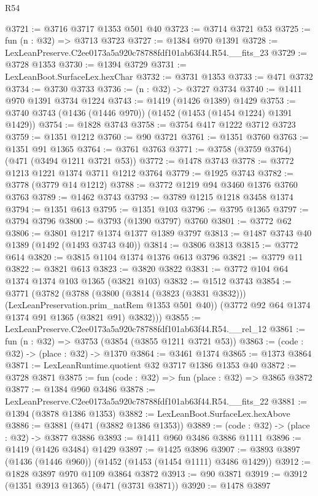 \begin{lexlean}{R54}
\begin{coremodule}
@3721 := @3716 @3717 @1353 @501 @40
@3723 := @3714 @3721 @53
@3725 := fun (n : @32) => @3713 @3723
@3727 := @1384 @970 @1391
@3728 := LexLeanPreserve.C2ee0173a5a920c78788fdf101ab63f44.R54.__fits_23
@3729 := @3728 @1353
@3730 := @1394 @3729
@3731 := LexLeanBoot.SurfaceLex.hexChar
@3732 := @3731 @1353
@3733 := @471 @3732
@3734 := @3730 @3733
@3736 := (n : @32) -> @3727 @3734
@3740 := @1411 @970 @1391 @3734 @1224
@3743 := @1419 (@1426 @1389) @1429
@3753 := @3740 @3743 (@1436 (@1446 @970)) (@1452 (@1453 (@1454 @1224) @1391 @1429))
@3754 := @1828 @3743
@3758 := @3754 @417 @1222 @3712 @3723
@3759 := @1351 @1212
@3760 := @90 @3721
@3761 := @1351 @3760
@3763 := @1351 @91 @1365
@3764 := @3761 @3763
@3771 := @3758 (@3759 @3764) (@471 (@3494 @1211 @3721 @53))
@3772 := @1478 @3743
@3778 := @3772 @1213 @1221 @1374 @3711 @1212 @3764
@3779 := @1925 @3743
@3782 := @3778 (@3779 @14 @1212)
@3788 := @3772 @1219 @94 @3460 @1376 @3760 @3763
@3789 := @1462 @3743
@3793 := @3789 @1215 @1218 @3458 @1374
@3794 := @1351 @613
@3795 := @1351 @103
@3796 := @3795 @1365
@3797 := @3794 @3796
@3800 := @3793 (@1390 @3797) @3760
@3801 := @3772 @62
@3806 := @3801 @1217 @1374 @1377 @1389 @3797
@3813 := @1487 @3743 @40 @1389 (@1492 (@1493 @3743 @40))
@3814 := @3806 @3813
@3815 := @3772 @614
@3820 := @3815 @1104 @1374 @1376 @613 @3796
@3821 := @3779 @11
@3822 := @3821 @613
@3823 := @3820 @3822
@3831 := @3772 @104 @64 @1374 @1374 @103 @1365 (@3821 @103)
@3832 := @1512 @3743
@3854 := @3771
    (@3782
      (@3788
        (@3800 (@3814 (@3823 (@3831 @3832))) (LexLeanPreservation.prim_natRem @1353 @501 @40))
        (@3772 @92 @64 @1374 @1374 @91 @1365 (@3821 @91) @3832)))
@3855 := LexLeanPreserve.C2ee0173a5a920c78788fdf101ab63f44.R54.__rel_12
@3861 := fun (n : @32) => @3753 (@3854 (@3855 @1211 @3721 @53))
@3863 := (code : @32) -> (place : @32) -> @1370
@3864 := @3461 @1374
@3865 := @1373 @3864
@3871 := LexLeanRuntime.quotient @32 @3717 @1386 @1353 @40
@3872 := @3728 @3871
@3875 := fun (code : @32) => fun (place : @32) => @3865 @3872
@3877 := @1384 @960 @3486
@3878 := LexLeanPreserve.C2ee0173a5a920c78788fdf101ab63f44.R54.__fits_22
@3881 := @1394 (@3878 @1386 @1353)
@3882 := LexLeanBoot.SurfaceLex.hexAbove
@3886 := @3881 (@471 (@3882 @1386 @1353))
@3889 := (code : @32) -> (place : @32) -> @3877 @3886
@3893 := @1411 @960 @3486 @3886 @1111
@3896 := @1419 (@1426 @3484) @1429
@3897 := @1425 @3896
@3907 := @3893 @3897 (@1436 (@1446 @960)) (@1452 (@1453 (@1454 @1111) @3486 @1429))
@3912 := @1828 @3897 @970 @1109 @3864 @3872
@3913 := @90 @3871
@3919 := @3912 (@1351 @3913 @1365) (@471 (@3731 @3871))
@3920 := @1478 @3897

\end{coremodule}
\end{lexlean}
